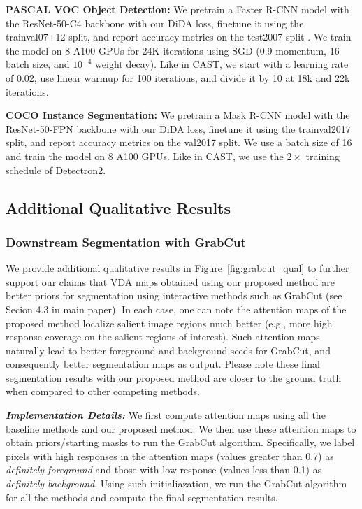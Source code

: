 \documentclass[10pt,twocolumn,letterpaper]{article}
\begin{document}
\begin{appendices}
\textbf{PASCAL VOC Object Detection:} We pretrain a Faster R-CNN \cite{ren2015faster,ren2016fasterpami} model with the ResNet-50-C4 \cite{he2016deep} backbone with our DiDA loss, finetune it using the trainval07+12 split, and report accuracy metrics on the test2007 split \cite{pascal-voc-2007}. We train the model on 8 A100 GPUs for 24K iterations using SGD (0.9 momentum, 16 batch size, and $10^{-4}$ weight decay). Like in CAST, we start with a learning
rate of 0.02, use linear warmup for 100 iterations, and divide it by 10 at 18k and 22k iterations.

\textbf{COCO Instance Segmentation:} We pretrain a Mask R-CNN \cite{he2017mask} model with the ResNet-50-FPN \cite{lin2017feature} backbone with our DiDA loss, finetune it using the trainval2017 split, and report accuracy metrics on the val2017 split. We use a batch size of 16 and train the model on 8 A100 GPUs. Like in CAST, we use the $2 \times $ training schedule of Detectron2.

\subsection{Additional Qualitative Results}
\subsubsection{Downstream Segmentation with GrabCut}

We provide additional qualitative results in Figure~\ref{fig:grabcut_qual} to further support our claims that VDA maps obtained using our proposed method are better priors for segmentation using interactive methods such as GrabCut (see Secion 4.3 in main paper).  In each case, one can note the attention maps of the proposed method localize salient image regions much better (e.g., more high response coverage on the salient regions of interest). Such attention maps naturally lead to better foreground and background seeds for GrabCut, and consequently better segmentation maps as output. Please note these final segmentation results with our proposed method are closer to the ground truth when compared to other competing methods.


\textbf{\textit{Implementation Details:}}
We first compute attention maps using all the baseline methods and our proposed method. We then use these attention maps to obtain priors/starting masks to run the GrabCut algorithm. Specifically, we label pixels with high responses in the attention maps (values greater than 0.7) as \textsl{definitely foreground} and those with low response (values less than 0.1) as \textsl{definitely background}. Using such initialiazation, we run the GrabCut algorithm for all the methods and compute the final segmentation results.




\end{appendices}
\end{document}
